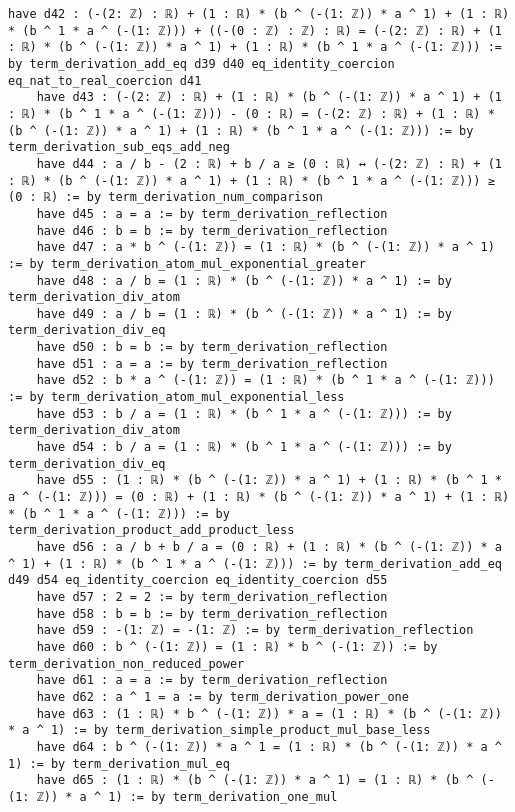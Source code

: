 \documentclass{article}
\begin{document}
\begin{tcolorbox}[colback=white!10, width=\linewidth]
\begin{lstlisting}[language=Lean4]
    have d42 : (-(2: ℤ) : ℝ) + (1 : ℝ) * (b ^ (-(1: ℤ)) * a ^ 1) + (1 : ℝ) * (b ^ 1 * a ^ (-(1: ℤ))) + ((-(0 : ℤ) : ℤ) : ℝ) = (-(2: ℤ) : ℝ) + (1 : ℝ) * (b ^ (-(1: ℤ)) * a ^ 1) + (1 : ℝ) * (b ^ 1 * a ^ (-(1: ℤ))) := by term_derivation_add_eq d39 d40 eq_identity_coercion eq_nat_to_real_coercion d41
    have d43 : (-(2: ℤ) : ℝ) + (1 : ℝ) * (b ^ (-(1: ℤ)) * a ^ 1) + (1 : ℝ) * (b ^ 1 * a ^ (-(1: ℤ))) - (0 : ℝ) = (-(2: ℤ) : ℝ) + (1 : ℝ) * (b ^ (-(1: ℤ)) * a ^ 1) + (1 : ℝ) * (b ^ 1 * a ^ (-(1: ℤ))) := by term_derivation_sub_eqs_add_neg
    have d44 : a / b - (2 : ℝ) + b / a ≥ (0 : ℝ) ↔ (-(2: ℤ) : ℝ) + (1 : ℝ) * (b ^ (-(1: ℤ)) * a ^ 1) + (1 : ℝ) * (b ^ 1 * a ^ (-(1: ℤ))) ≥ (0 : ℝ) := by term_derivation_num_comparison
    have d45 : a = a := by term_derivation_reflection
    have d46 : b = b := by term_derivation_reflection
    have d47 : a * b ^ (-(1: ℤ)) = (1 : ℝ) * (b ^ (-(1: ℤ)) * a ^ 1) := by term_derivation_atom_mul_exponential_greater
    have d48 : a / b = (1 : ℝ) * (b ^ (-(1: ℤ)) * a ^ 1) := by term_derivation_div_atom
    have d49 : a / b = (1 : ℝ) * (b ^ (-(1: ℤ)) * a ^ 1) := by term_derivation_div_eq
    have d50 : b = b := by term_derivation_reflection
    have d51 : a = a := by term_derivation_reflection
    have d52 : b * a ^ (-(1: ℤ)) = (1 : ℝ) * (b ^ 1 * a ^ (-(1: ℤ))) := by term_derivation_atom_mul_exponential_less
    have d53 : b / a = (1 : ℝ) * (b ^ 1 * a ^ (-(1: ℤ))) := by term_derivation_div_atom
    have d54 : b / a = (1 : ℝ) * (b ^ 1 * a ^ (-(1: ℤ))) := by term_derivation_div_eq
    have d55 : (1 : ℝ) * (b ^ (-(1: ℤ)) * a ^ 1) + (1 : ℝ) * (b ^ 1 * a ^ (-(1: ℤ))) = (0 : ℝ) + (1 : ℝ) * (b ^ (-(1: ℤ)) * a ^ 1) + (1 : ℝ) * (b ^ 1 * a ^ (-(1: ℤ))) := by term_derivation_product_add_product_less
    have d56 : a / b + b / a = (0 : ℝ) + (1 : ℝ) * (b ^ (-(1: ℤ)) * a ^ 1) + (1 : ℝ) * (b ^ 1 * a ^ (-(1: ℤ))) := by term_derivation_add_eq d49 d54 eq_identity_coercion eq_identity_coercion d55
    have d57 : 2 = 2 := by term_derivation_reflection
    have d58 : b = b := by term_derivation_reflection
    have d59 : -(1: ℤ) = -(1: ℤ) := by term_derivation_reflection
    have d60 : b ^ (-(1: ℤ)) = (1 : ℝ) * b ^ (-(1: ℤ)) := by term_derivation_non_reduced_power
    have d61 : a = a := by term_derivation_reflection
    have d62 : a ^ 1 = a := by term_derivation_power_one
    have d63 : (1 : ℝ) * b ^ (-(1: ℤ)) * a = (1 : ℝ) * (b ^ (-(1: ℤ)) * a ^ 1) := by term_derivation_simple_product_mul_base_less
    have d64 : b ^ (-(1: ℤ)) * a ^ 1 = (1 : ℝ) * (b ^ (-(1: ℤ)) * a ^ 1) := by term_derivation_mul_eq
    have d65 : (1 : ℝ) * (b ^ (-(1: ℤ)) * a ^ 1) = (1 : ℝ) * (b ^ (-(1: ℤ)) * a ^ 1) := by term_derivation_one_mul

\end{lstlisting}
\end{tcolorbox}
\end{document}
